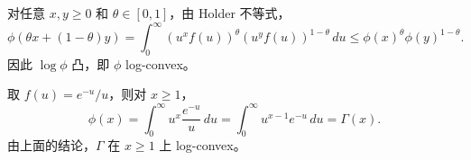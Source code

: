 \documentclass{ctexart}
\begin{document}
\begin{solution}
  对任意 $x,y\geq0$ 和 $\theta\in[0,1]$，由 Holder 不等式，
  \[
    \phi(\theta x+(1-\theta)y)
    =\int_0^\infty (u^x f(u))^\theta (u^y f(u))^{1-\theta}\,du
    \leq
    \phi(x)^\theta\phi(y)^{1-\theta}.
  \]
  因此 $\log\phi$ 凸，即 $\phi$ log-convex。

  取 $f(u)=e^{-u}/u$，则对 $x\geq1$，
  \[
    \phi(x)=\int_0^\infty u^x\frac{e^{-u}}{u}\,du
    =\int_0^\infty u^{x-1}e^{-u}\,du
    =\Gamma(x).
  \]
  由上面的结论，$\Gamma$ 在 $x\geq1$ 上 log-convex。
\end{solution}
\end{document}
